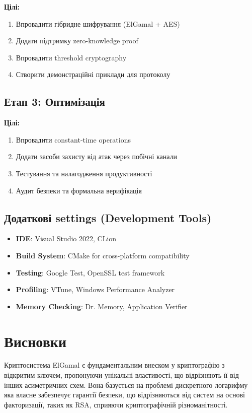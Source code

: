 \textbf{Цілі:}
\begin{enumerate}
    \item Впровадити гібридне шифрування (ElGamal + AES)
    \item Додати підтримку zero-knowledge proof
    \item Впровадити threshold cryptography
    \item Створити демонстраційні приклади для протоколу
\end{enumerate}

\subsection{Етап 3: Оптимізація}

\textbf{Цілі:}
\begin{enumerate}
    \item Впровадити constant-time operations
    \item Додати засоби захисту від атак через побічні канали
    \item Тестування та налагодження продуктивності
    \item Аудит безпеки та формальна верифікація
\end{enumerate}

\subsection{Додаткові settings (Development Tools)}

\begin{itemize}
    \item \textbf{IDE}: Visual Studio 2022, CLion
    \item \textbf{Build System}: CMake for cross-platform compatibility
    \item \textbf{Testing}: Google Test, OpenSSL test framework
    \item \textbf{Profiling}: VTune, Windows Performance Analyzer
    \item \textbf{Memory Checking}: Dr. Memory, Application Verifier
\end{itemize}

\section{Висновки}

Криптосистема ElGamal є фундаментальним внеском у криптографію з відкритим ключем, пропонуючи унікальні
властивості, що відрізняють її від інших асиметричних схем. Вона базується на проблемі дискретного логарифму 
яка власне забезпечує гарантії безпеки, що відрізняються від систем на основі факторизації, таких як RSA, 
сприяючи криптографічній різноманітності.

